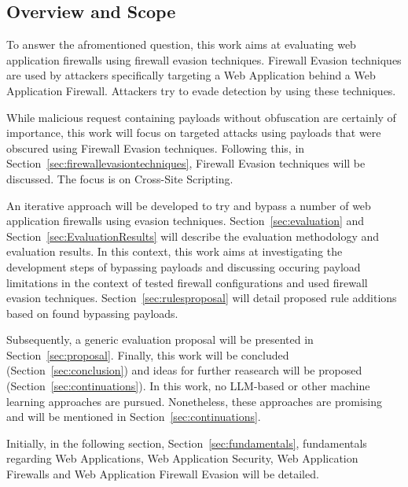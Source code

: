 \subsection{Overview and Scope}
To answer the afromentioned question, this work aims at evaluating web application firewalls using firewall evasion techniques. Firewall Evasion techniques are used by attackers specifically targeting a Web Application behind a Web Application Firewall. Attackers try to evade detection by using these techniques. 

While malicious request containing payloads without obfuscation are certainly of importance, this work will focus on targeted attacks using payloads that were obscured using Firewall Evasion techniques.
Following this, in Section~\ref{sec:firewallevasiontechniques}, Firewall Evasion techniques will be discussed. The focus is on Cross-Site Scripting. 

An iterative approach will be developed to try and bypass a number of web application firewalls using evasion techniques. Section~\ref{sec:evaluation} and Section~\ref{sec:EvaluationResults} will describe the evaluation methodology and evaluation results. In this context, this work aims at investigating the development steps of bypassing payloads and discussing occuring payload limitations in the context of tested firewall configurations and used firewall evasion techniques. Section~\ref{sec:rulesproposal} will detail proposed rule additions based on found bypassing payloads.

Subsequently, a generic evaluation proposal will be presented in Section~\ref{sec:proposal}. Finally, this work will be concluded (Section~\ref{sec:conclusion}) and ideas for further reasearch will be proposed (Section~\ref{sec:continuations}). In this work, no LLM-based or other machine learning approaches are pursued. Nonetheless, these approaches are promising and will be mentioned in Section~\ref{sec:continuations}.

Initially, in the following section, Section~\ref{sec:fundamentals}, fundamentals regarding Web Applications, Web Application Security, Web Application Firewalls and Web Application Firewall Evasion will be detailed.
